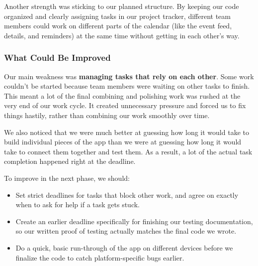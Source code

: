 \documentclass[a4paper,12pt]{article}
\begin{document}
Another strength was sticking to our planned structure. By keeping our code organized and clearly assigning tasks in our project tracker, different team members could work on different parts of the calendar (like the event feed, details, and reminders) at the same time without getting in each other's way.

\subsubsection{What Could Be Improved}

Our main weakness was \textbf{managing tasks that rely on each other}. Some work couldn't be started because team members were waiting on other tasks to finish. This meant a lot of the final combining and polishing work was rushed at the very end of our work cycle. It created unnecessary pressure and forced us to fix things hastily, rather than combining our work smoothly over time.

We also noticed that we were much better at guessing how long it would take to build individual pieces of the app than we were at guessing how long it would take to connect them together and test them. As a result, a lot of the actual task completion happened right at the deadline.

To improve in the next phase, we should:
\begin{itemize}
    \item Set strict deadlines for tasks that block other work, and agree on exactly when to ask for help if a task gets stuck.
    \item Create an earlier deadline specifically for finishing our testing documentation, so our written proof of testing actually matches the final code we wrote.
    \item Do a quick, basic run-through of the app on different devices before we finalize the code to catch platform-specific bugs earlier.
\end{itemize}
\end{document}
